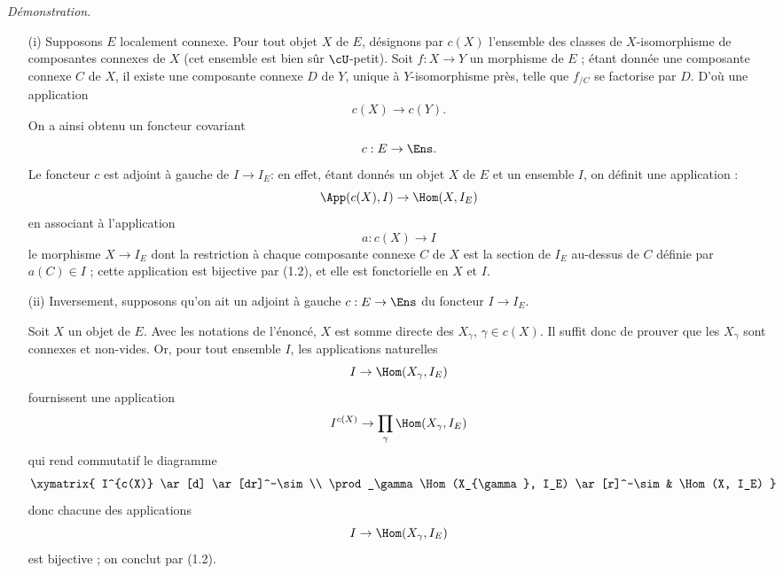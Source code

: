{\it Démonstration}.
\begin{enumerate}
    \item[(i)] Supposons $E$ localement connexe. Pour tout objet $X$ de $E$, désignons par $c(X)$ l'ensemble des classes de $X$-isomorphisme de composantes connexes de $X$ (cet ensemble est bien sûr $\cU$-petit). Soit $f: X \to Y$ un morphisme de $E$ ; étant donnée une composante connexe $C$ de $X$, il existe une composante connexe $D$ de $Y$, unique à $Y$-isomorphisme près, telle que $f_{/C}$ se factorise par $D$. D'où une application
    $$
    c(X) \to c(Y).
    $$
    On a ainsi obtenu un foncteur covariant
    $$
    c: E \to \Ens.
    $$
    Le foncteur $c$ est adjoint à gauche de $I \to I_E$: en effet, étant donnés un objet $X$ de $E$ et un ensemble $I$, on définit une application : 
    $$
    \App(c(X), I) \to \Hom(X, I_E)
    $$
    en associant à l'application
    $$
    a: c(X) \to I
    $$
    le morphisme $X \to I_E$ dont la restriction à chaque composante connexe $C$ de $X$ est la section de $I_E$ au-dessus de $C$ définie par $a(C) \in I$ ; cette application est bijective par (1.2), et elle est fonctorielle en $X$ et $I$.
    \item[(ii)] Inversement, supposons qu'on ait un adjoint à gauche $c: E \to \Ens$ du foncteur $I \to I_E$.
    
    Soit $X$ un objet de $E$. Avec les notations de l'énoncé, $X$ est somme directe des $X_{\gamma}$, $\gamma \in c(X)$. Il suffit donc de prouver que les $X_{\gamma}$ sont connexes et non-vides. Or, pour tout ensemble $I$, les applications naturelles
    $$
    I \to \Hom(X_{\gamma}, I_E)
    $$
    fournissent une application
    $$
    I^{c(X)} \to \prod_\gamma \Hom(X_{\gamma}, I_E)
    $$
    qui rend commutatif le diagramme
    \[
        \xymatrix{
        I^{c(X)} \ar[d] \ar[dr]^-\sim \\
        \prod_\gamma \Hom(X_{\gamma}, I_E) \ar[r]^-\sim & \Hom(X, I_E)
        }
    \]
    donc chacune des applications
    $$
    I \to \Hom(X_{\gamma}, I_E)
    $$
    est bijective ; on conclut par (1.2).
\end{enumerate}







